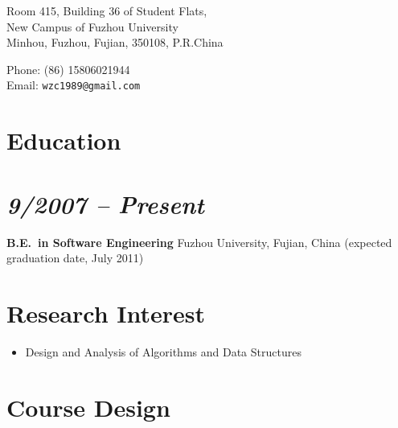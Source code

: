 \documentclass[margin,line]{res}
\newcommand{\ressection}[1]{
    {\colorbox{bg}{\fontfamily{phv}\selectfont\large#1}}
}
\begin{document}


\begin{resume}
 \hspace{-1cm}
\begin{minipage}{1\linewidth}
  \begin{minipage}{0.49\linewidth}
    Room 415, Building 36 of Student Flats, \\
    New Campus of Fuzhou University \\
    Minhou, Fuzhou, Fujian, 350108, P.R.China \\
  \end{minipage}%
  \hspace{\fill}%
  \begin{minipage}{0.49\linewidth}%
    {\Large{}}Phone: (86) 15806021944 \\
    {\Large{}}Email: {\tt wzc1989@gmail.com} \\
  \end{minipage}
\end{minipage}

\section{\ressection{Education}}

\section{\em 9/2007 -- Present}
\textbf{B.E.\  in Software Engineering} \newline
 Fuzhou University, Fujian, China
 \newline
 (expected graduation date, July 2011)

\section{\ressection{Research Interest}}
\vspace{1cm}
\begin{itemize}
\item[\ding {52}] Design and Analysis of Algorithms and  Data Structures
\end{itemize}

\section{\ressection{Course Design}}
\vspace{1cm}

\end{resume}
\end{document}
